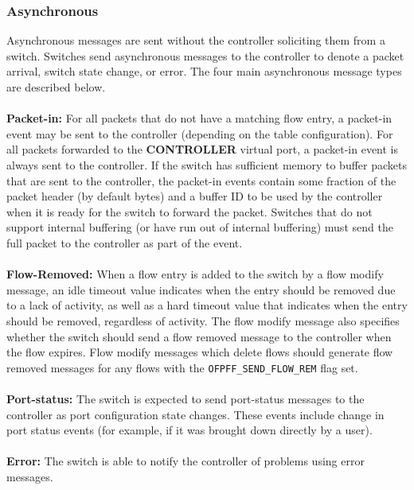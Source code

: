 \documentclass[10pt]{article}
\begin{document}
\subsubsection{Asynchronous}
\label{sec:asynchronous}
Asynchronous messages are sent without the controller soliciting them from a switch.  Switches send asynchronous messages to the controller to denote a packet arrival, switch state change, or error.  The four main asynchronous message types are described below.
\\\\
\textbf{Packet-in:} For all packets that do not have a matching flow entry, a packet-in event may be sent to the controller (depending on the table configuration). For all packets forwarded to the \textbf{CONTROLLER} virtual port, a packet-in event is always sent to the controller.  If the switch has sufficient memory to buffer packets that are sent to the controller, the packet-in events contain some fraction of the packet header (by default  bytes) and a buffer ID to be used by the controller when it is ready for the switch to forward the packet.  Switches that do not support internal buffering (or have run out of internal buffering) must send the full packet to the controller as part of the event.
\\\\
\textbf{Flow-Removed:} When a flow entry is added to the switch by a flow modify message, an idle timeout value indicates when the entry should be removed due to a lack of activity, as well as a hard timeout value that indicates when the entry should be removed, regardless of activity.  The flow modify message also specifies whether the switch should send a flow removed message to the controller when the flow expires.  Flow modify messages which delete flows should generate flow removed messages for any flows with the \verb|OFPFF_SEND_FLOW_REM| flag set.
\\\\
\textbf{Port-status:} The switch is expected to send port-status messages to the controller as port configuration state changes.  These events include change in port status events (for example, if it was brought down directly by a user).
\\\\
\textbf{Error:} The switch is able to notify the controller of problems using error messages. 
\end{document}

